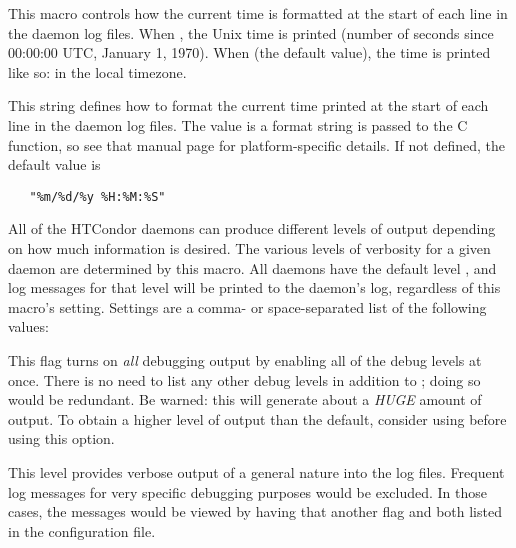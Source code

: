 \begin{description}
\label{param:LogsUseTimestamp}
\item[\Macro{LOGS\_USE\_TIMESTAMP}]
  This macro controls how the current time is formatted at the start of
  each line in the daemon log files. When , the Unix time is
  printed (number of seconds since 00:00:00 UTC, January 1, 1970).
  When  (the default value), the time is printed like so:
   in the local timezone.

\label{param:DebugTimeFormat}
\item[\Macro{DEBUG\_TIME\_FORMAT}]
  This string defines how to format the current time printed at the
  start of each line in the daemon log files.  The value is a format 
  string is passed to the C  function,
  so see that manual page for platform-specific details.
  If not defined, the default value is 
\begin{verbatim}
   "%m/%d/%y %H:%M:%S"
\end{verbatim}

\label{param:SubsysDebug}
\item[\MacroB{<SUBSYS>\_DEBUG}]
  All of the
  HTCondor daemons can produce different levels of output depending on
  how much information is desired.  The various levels of
  verbosity for a given daemon are determined by this macro.  All
  daemons have the default level , and log messages for
  that level will be printed to the daemon's log, regardless of this
  macro's setting.  Settings are a comma- or space-separated list
  of the following values:

  \begin{description}
    \label{list:debug-level-description}

  \label{dflag:all}
  \item[\Dflag{ALL}]
    This flag turns on \emph{all} debugging output by enabling all of the debug
    levels at once.  There is no need to list any other debug levels in addition
    to ; doing so would be redundant.  Be warned: this will
    generate
    about a \emph{HUGE} amount of output.
    To obtain a higher
    level of output than the default, consider using  before
    using this option.

  \label{dflag:fulldebug}
  \item[\Dflag{FULLDEBUG}]
    This level
    provides verbose output of a general nature into the log files.  
    Frequent log messages for very specific debugging
    purposes would be excluded. In those cases, the messages would
    be viewed by having that another flag and  both
    listed in the configuration file.


\end{description}
\end{description}
